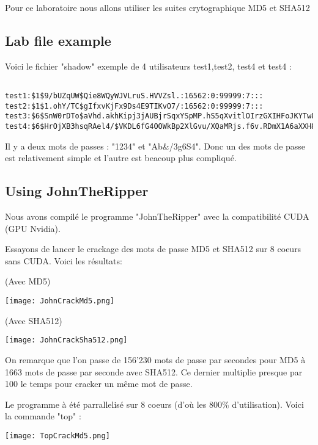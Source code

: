 Pour ce laboratoire nous allons utiliser les suites crytographique MD5 et SHA512

\pagebreak
\subsection{Lab file example}
Voici le fichier "shadow" exemple de 4 utilisateurs test1,test2, test4 et test4 :
\begin{lstlisting}[frame=single,style=Console]  % Start your code-block

test1:$1$9/bUZqUW$Qie8WQyWJVLruS.HVVZsl.:16562:0:99999:7:::
test2:$1$1.ohY/TC$gIfxvKjFx9Ds4E9TIKvO7/:16562:0:99999:7:::
test3:$6$SnW0rDTo$aVhd.akhKipj3jAUBjrSqxYSpMP.hS5qXvitlOIrzGXIHFoJKYTw8YeRRGbh0VJzQYeh2MTwQjJ36BoGs9oyz1:16562:0:99999:7:::
test4:$6$HrOjXB3hsqRAel4/$VKDL6fG4OOWkBp2XlGvu/XQaMRjs.f6v.RDmX1A6aXXH8HYVeOULykT1MNAbvtwl6DAyIQL7AEze2nfX7KyaA0:16562:0:99999:7:::
\end{lstlisting}

Il y a deux mots de passes : "1234" et "Ab\&/3g6S4". Donc un des mots de passe est relativement simple et l'autre est beacoup plus compliqué.
 
\subsection{Using JohnTheRipper}
Nous avons compilé le programme "JohnTheRipper" avec la compatibilité CUDA (GPU Nvidia).

Essayons de lancer le crackage des mots de passe MD5 et SHA512 sur 8 coeurs sans CUDA. Voici les résultats:

(Avec MD5)
\begin{center} 
\hspace{15cm}
\texttt{[image: JohnCrackMd5.png]}
\end{center}
\vspace{0.5cm}

(Avec SHA512)
\begin{center} 
\hspace{15cm}
\texttt{[image: JohnCrackSha512.png]}
\end{center}
\vspace{0.5cm}

On remarque que l'on passe de 156'230 mots de passe par secondes pour MD5 à 1663 mots de passe par seconde avec SHA512. Ce dernier multiplie presque par 100 le temps pour cracker un même mot de passe.
\pagebreak
 
Le programme à été parrallelisé sur 8 coeurs (d'où les 800\% d'utilisation). Voici la commande "top" :
\begin{center} 
\hspace{15cm}
\texttt{[image: TopCrackMd5.png]}
\end{center}
\vspace{0.5cm}
 
